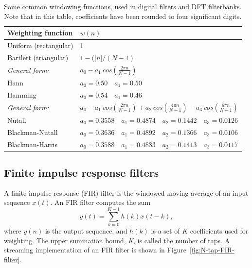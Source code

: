 \documentclass{ws-rv961x669}
\begin{document}



\begin{table}
	\caption{Some common windowing functions, used in digital filters and DFT filterbanks. Note that in this table, coefficients have been rounded to four significant digits. \label{tab:window_fns}}
	\begin{tabular}{l l }
	\hline
	Weighting function      & $w(n)$                        			\\
	\hline
	\hline
	Uniform  (rectangular)   &  1                           			\\
	Bartlett (triangular)    &  $1 - (|n| / (N-1)$               	\\
	\hline
	\emph{General form:}    & $a_0 - a_1~cos(\frac{2\pi n}{N-1})$ \\
	Hann                     & $a_0=0.50 \quad a_1 = 0.50$ 	\\
	Hamming             & $ a_0 = 0.54 \quad a_1 = 0.46$   	\\
	\hline
	
	 \emph{General form:} &$a_0 - a_1~cos(\frac{2\pi n}{N-1}) + a_2~cos(\frac{4\pi n}{N-1}) -
	 					   a_3~cos(\frac{6\pi n}{N-1}) $	 \\
	 Nutall          & $a_0=0.3558\quad a_1=0.4874\quad a_2=0.1442\quad a_3=0.0126$ \\
	 Blackman-Nutall & $a_0=0.3636\quad a_1=0.4892\quad a_2=0.1366\quad a_3=0.0106$ \\
	 Blackman-Harris & $a_0=0.3588\quad a_1=0.4883\quad a_2=0.1413\quad a_3=0.0117$ \\
	\hline
	\end{tabular}

\end{table}


\subsection{Finite impulse response filters}\label{sec:filters}

A finite impulse response (FIR) filter is the windowed moving average of an input sequence $x(t)$. An FIR filter computes the sum 
\begin{equation} 
y(t)=\sum_{k=0}^{K-1}h(k)x(t-k),\label{eq:FIR-filter}
\end{equation}
where $y(n)$ is the output sequence, and $h(k)$ is a set of $K$ coefficients used for weighting. The upper summation bound, \emph{K}, is called the number of taps.\emph{ }A streaming implementation of an FIR filter is shown in Figure~\ref{fig:N-tap-FIR-filter}.
\end{document}
